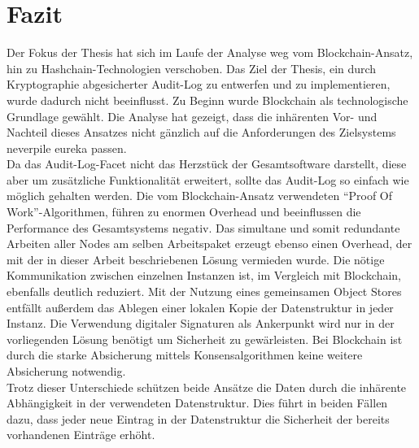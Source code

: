\chapter{Fazit}
Der Fokus der Thesis hat sich im Laufe der Analyse weg vom Blockchain-Ansatz, hin zu Hashchain-Technologien verschoben. Das Ziel der Thesis, ein durch Kryptographie abgesicherter Audit-Log zu entwerfen und zu implementieren, wurde dadurch nicht beeinflusst. Zu Beginn wurde Blockchain als technologische Grundlage gewählt. Die Analyse hat gezeigt, dass die inhärenten Vor- und Nachteil dieses Ansatzes nicht gänzlich auf die Anforderungen des Zielsystems neverpile eureka passen.\\
Da das Audit-Log-Facet nicht das Herzstück der Gesamtsoftware darstellt, diese aber um zusätzliche Funktionalität erweitert, sollte das Audit-Log so einfach wie möglich gehalten werden. Die vom Blockchain-Ansatz verwendeten "`Proof Of Work"'-Algorithmen, führen zu enormen Overhead und beeinflussen die Performance des Gesamtsystems negativ. Das simultane und somit redundante Arbeiten aller Nodes am selben Arbeitspaket erzeugt ebenso einen Overhead, der mit der in dieser Arbeit beschriebenen Lösung vermieden wurde. Die nötige Kommunikation zwischen einzelnen Instanzen ist, im Vergleich mit Blockchain, ebenfalls deutlich reduziert. Mit der Nutzung eines gemeinsamen Object Stores entfällt außerdem das Ablegen einer lokalen Kopie der Datenstruktur in jeder Instanz. Die Verwendung digitaler Signaturen als Ankerpunkt wird nur in der vorliegenden Lösung benötigt um Sicherheit zu gewärleisten. Bei Blockchain ist durch die starke Absicherung mittels Konsensalgorithmen keine weitere Absicherung notwendig.\\
Trotz dieser Unterschiede schützen beide Ansätze die Daten durch die inhärente Abhängigkeit in der verwendeten Datenstruktur. Dies führt in beiden Fällen dazu, dass jeder neue Eintrag in der Datenstruktur die Sicherheit der bereits vorhandenen Einträge erhöht.\\
